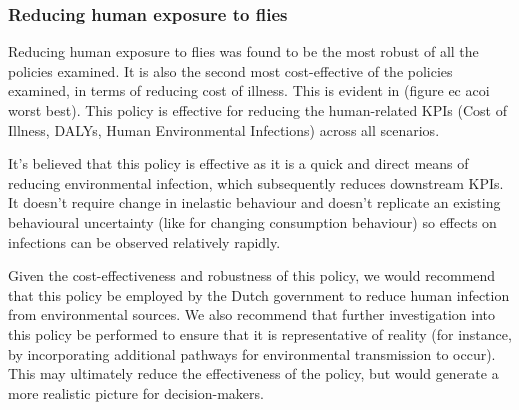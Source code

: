 \subsubsection{Reducing human exposure to flies}
\label{reducing human exposure to flies}
Reducing human exposure to flies was found to be the most robust of all the policies examined. It is also the second most cost-effective of the policies examined, in terms of reducing cost of illness. This is evident in (figure ec acoi worst best). This policy is effective for reducing the human-related KPIs (Cost of Illness, DALYs, Human Environmental Infections) across all scenarios. 

It's believed that this policy is effective as it is a quick and direct means of reducing environmental infection, which subsequently reduces downstream KPIs. It doesn't require change in inelastic behaviour and doesn't replicate an existing behavioural uncertainty (like for changing consumption behaviour) so effects on infections can be observed relatively rapidly.

Given the cost-effectiveness and robustness of this policy, we would recommend that this policy be employed by the Dutch government to reduce human infection from environmental sources. We also recommend that further investigation into this policy be performed to ensure that it is representative of reality (for instance, by incorporating additional pathways for environmental transmission to occur). This may ultimately reduce the effectiveness of the policy, but would generate a more realistic picture for decision-makers.

